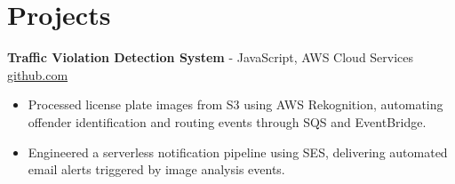 \documentclass[11pt]{article}       %
\begin{document}
\vspace{-18.5pt}

\section*{Projects}

\textbf{Traffic Violation Detection System}{ - JavaScript, AWS Cloud Services} \hfill \href{https://github.com/Monica20030707/AWS_rekonigition-N-read-database}{github.com} \\
\vspace{-9pt}
\begin{itemize}
  \item Processed license plate images from S3 using AWS Rekognition, automating offender identification and routing events through SQS and EventBridge.
  \item Engineered a serverless notification pipeline using SES, delivering automated email alerts triggered by image analysis events.
\end{itemize}

\end{document}
